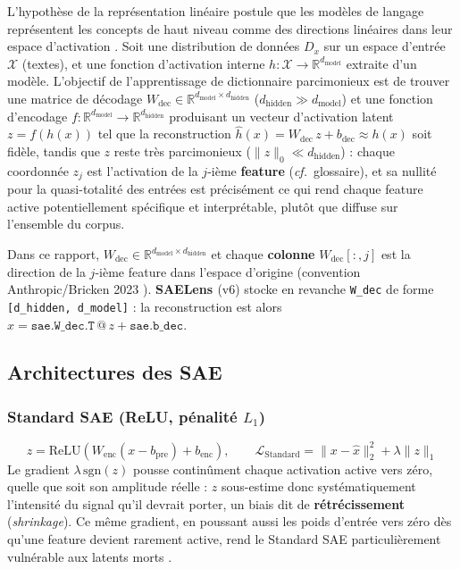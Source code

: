 \documentclass[11pt]{article}
\begin{document}
L'hypothèse de la représentation linéaire postule que les modèles de langage
représentent les concepts de haut niveau comme des directions linéaires dans
leur espace d'activation \cite{elhage2022superposition}. Soit une distribution
de données $D_x$ sur un espace d'entrée $\mathcal{X}$ (textes), et une
fonction d'activation interne $h : \mathcal{X} \rightarrow \mathbb{R}^{d_\text{model}}$
extraite d'un modèle. L'objectif de l'apprentissage de dictionnaire
parcimonieux est de trouver une matrice de décodage
$W_\text{dec} \in \mathbb{R}^{d_\text{model} \times d_\text{hidden}}$
($d_\text{hidden} \gg d_\text{model}$) et une fonction d'encodage
$f : \mathbb{R}^{d_\text{model}} \rightarrow \mathbb{R}^{d_\text{hidden}}$
produisant un vecteur d'activation latent $z = f(h(x))$ tel que la
reconstruction $\hat{h}(x) = W_\text{dec}\, z + b_\text{dec} \approx h(x)$ soit
fidèle, tandis que $z$ reste très parcimonieux ($\|z\|_0 \ll d_\text{hidden}$) :
chaque coordonnée $z_j$ est l'activation de la $j$-ième \textbf{feature}
(\emph{cf.}~glossaire), et sa nullité pour la quasi-totalité des entrées est
précisément ce qui rend chaque feature active potentiellement spécifique et
interprétable, plutôt que diffuse sur l'ensemble du corpus.

\begin{definitionbox}
Dans ce rapport, $W_\text{dec} \in \mathbb{R}^{d_\text{model} \times d_\text{hidden}}$
et chaque \textbf{colonne} $W_\text{dec}[:,j]$ est la direction de la $j$-ième
feature dans l'espace d'origine (convention Anthropic/Bricken 2023
\cite{bricken2023monosemanticity}). \textbf{SAELens \cite{bloom2024saelens}} (v6) stocke en revanche
\texttt{W\_dec} de forme \texttt{[d\_hidden, d\_model]} : la reconstruction est
alors $\hat{x} = \texttt{sae.W\_dec.T} \mathbin{@} z + \texttt{sae.b\_dec}$.
\end{definitionbox}

\subsection{Architectures des SAE}

\subsubsection{Standard SAE (ReLU, pénalité $L_1$)}
\[
  z = \text{ReLU}(W_\text{enc}(x - b_\text{pre}) + b_\text{enc}), \qquad
  \mathcal{L}_\text{Standard} = \|x - \hat{x}\|_2^2 + \lambda \|z\|_1
\]
Le gradient $\lambda\,\text{sgn}(z)$ pousse continûment chaque activation
active vers zéro, quelle que soit son amplitude réelle : $z$ sous-estime donc
systématiquement l'intensité du signal qu'il devrait porter, un biais dit de
\textbf{rétrécissement} (\emph{shrinkage}). Ce même gradient, en poussant
aussi les poids d'entrée vers zéro dès qu'une feature devient rarement
active, rend le Standard SAE particulièrement vulnérable aux latents morts
\cite{cunningham2023sparse}.
\end{document}
